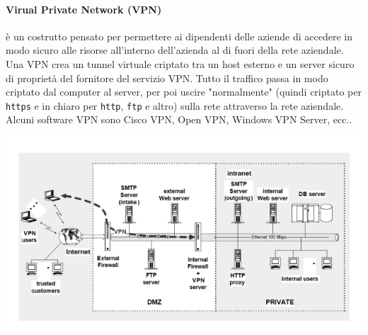 \documentclass[a4paper]{report}
\begin{document}
\paragraph{Virual Private Network (VPN)} è un costrutto pensato per permettere ai dipendenti delle aziende di accedere in modo sicuro alle risorse all'interno dell'azienda al di fuori della rete aziendale. Una VPN crea un tunnel virtuale criptato tra un host esterno e un server sicuro di proprietà del fornitore del servizio VPN. Tutto il traffico passa in modo criptato dal computer al server, per poi uscire "normalmente" (quindi criptato per \texttt{https} e in chiaro per \texttt{http}, \texttt{ftp} e altro) sulla rete attraverso la rete aziendale. Alcuni software VPN sono Cisco VPN, Open VPN, Windows VPN Server, ecc..
\begin{center}
\includegraphics[scale=0.6]{vpn.png}
\end{center}
\end{document}
